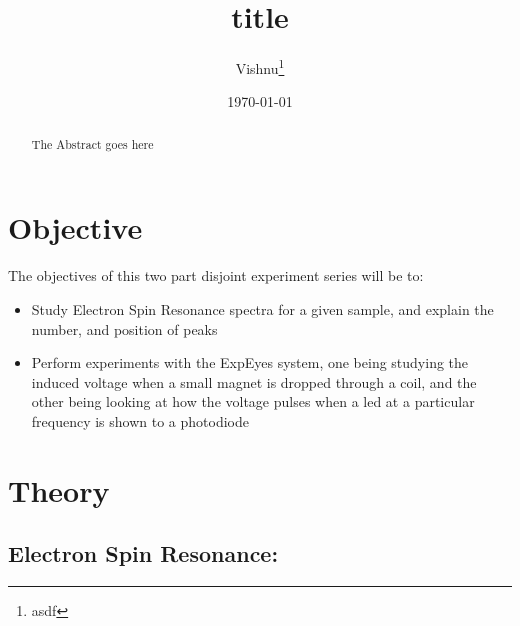 \documentclass{double}
\begin{document}
\title{title}
\author{Vishnu\thanks{asdf}}
\date{\today}
\maketitle

\begin{abstract}

The Abstract goes here

\end{abstract}

\section{Objective}

The objectives of this two part disjoint experiment series will be to:

\begin{itemize}
\tightlist
\item
  Study Electron Spin Resonance spectra for a given sample, and explain the number, and position of peaks
\item
  Perform experiments with the ExpEyes system, one being studying the induced voltage when a small magnet is dropped through a coil, and the other being looking at how the voltage pulses when a led at a particular frequency is shown to a photodiode
\end{itemize}

\section{Theory}

\subsection{Electron Spin Resonance:}
\end{document}
